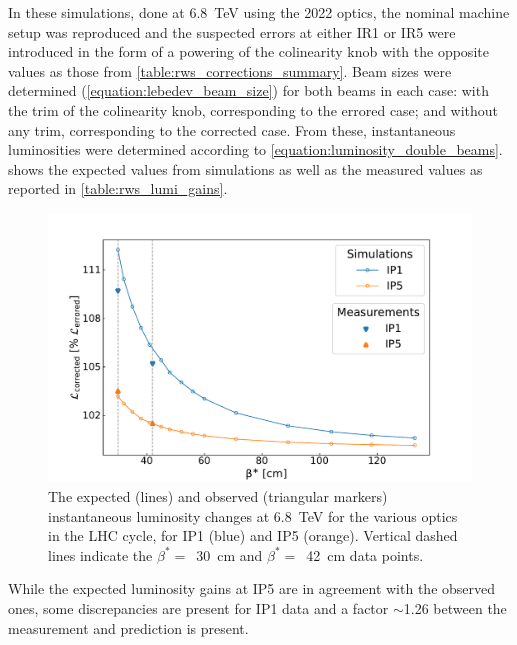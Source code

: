In these simulations, done at \qty{6.8}{\tera\electronvolt} using the \num{2022} optics, the nominal machine setup was reproduced and the suspected errors at either IR\num{1} or IR\num{5} were introduced in the form of a powering of the colinearity knob with the opposite values as those from \cref{table:rws_corrections_summary}.
Beam sizes were determined (\cref{equation:lebedev_beam_size}) for both beams in each case: with the trim of the colinearity knob, corresponding to the errored case; and without any trim, corresponding to the corrected case.
From these, instantaneous luminosities were determined according to \cref{equation:luminosity_double_beams}.
 shows the expected values from simulations as well as the measured values as reported in \cref{table:rws_lumi_gains}.

\begin{figure}[!htb]
    \centering
    \includegraphics*[width=\textwidth]{Figures/IR_Coupling_Correction/expected_vs_observed_lumigains.pdf}
    \caption{The expected (lines) and observed (triangular markers) instantaneous luminosity changes at \qty{6.8}{\tera\electronvolt} for the various optics in the LHC cycle, for IP\num{1} (\textcolor{mplblue}{blue}) and IP\num{5} (\textcolor{mplorange}{orange}). Vertical dashed lines indicate the \(\beta^{\ast} =\)~\qty{30}{\centi\meter} and \(\beta^{\ast} =\)~\qty{42}{\centi\meter} data points.}
    \label{figure:expected_vs_observed_lumigains}
\end{figure}

While the expected luminosity gains at IP\num{5} are in agreement with the observed ones, some discrepancies are present for IP\num{1} data and a factor \(\sim\)\num{1.26} between the measurement and prediction is present.

